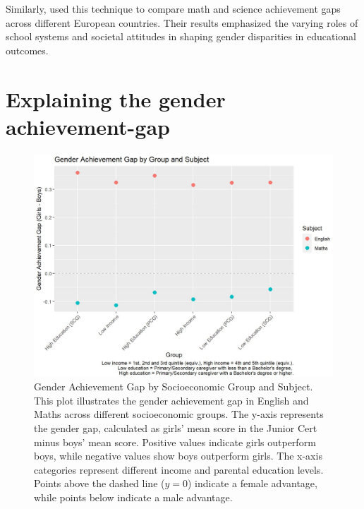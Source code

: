 \documentclass[12pt,a4paper,onecolumn]{article}
\numberwithin{equation}{section}
\begin{document}
Similarly, \parencite{karakolidis2016} used this technique to compare math and science achievement gaps across different European countries. Their results emphasized the varying roles of school systems and societal attitudes in shaping gender disparities in educational outcomes.

\section{Explaining the gender achievement-gap}

\begin{figure}[ht] 
    \centering
    \includegraphics[width=1\linewidth]{Gender_gap_by_group.JPG}
    \caption{Gender Achievement Gap by Socioeconomic Group and Subject. This plot illustrates the gender achievement gap in English and Maths across different socioeconomic groups. The y-axis represents the gender gap, calculated as girls' mean score in the Junior Cert minus boys' mean score. Positive values indicate girls outperform boys, while negative values show boys outperform girls. The x-axis categories represent different income and parental education levels. Points above the dashed line ($y=0$) indicate a female advantage, while points below indicate a male advantage.}
    \label{fig:OBDecompGroup}
\end{figure}
\end{document}
